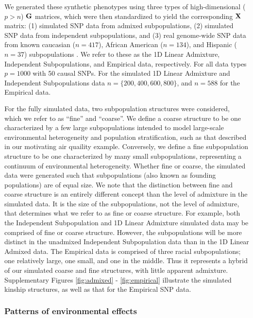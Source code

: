We generated these synthetic phenotypes using three types of high-dimensional ($p > n$) $\mathbf{G}$ matrices, which were then standardized to yield the corresponding $\mathbf{X}$ matrix: (1) simulated SNP data from admixed subpopulations, (2) simulated SNP data from independent subpopulations, and (3) real genome-wide SNP data from known caucasian ($n = 417$), African American ($n = 134$), and Hispanic ($n = 37$) subpopulations \citep{larkin2015objectives}. We refer to these as the 1D Linear Admixture, Independent Subpopulations, and Empirical data, respectively. For all data types $p = 1000$ with 50 causal SNPs. For the simulated 1D Linear Admixture and Independent Subpopulations data $n = \{200, 400, 600, 800 \}$, and $n = 588$ for the Empirical data. 

For the fully simulated data, two subpopulation structures were considered, which we refer to as ``fine'' and ``coarse''.  We define a coarse structure to be one characterized by a few large subpopulations intended to model large-scale environmental heterogeneity and population stratification, such as that described in our motivating air quaility example. Conversely, we define a fine subpopulation structure to be one characterized by many small subpopulations, representing a continuum of environmental heterogeneity. Whether fine or coarse, the simulated data were generated such that subpopulations (also known as founding populations) are of equal size. We note that the distinction between fine and coarse structure is an entirely different concept than the level of admixture in the simulated data. It is the size of the subpopulations, not the level of admixture, that determines what we refer to as fine or coarse structure. For example, both the Independent Subpopulation and 1D Linear Admixture simulated data may be comprised of fine or coarse structure. However, the subpopulations will be more distinct in the unadmixed Independent Subpopulation data than in the 1D Linear Admixed data. The Empirical data is comprised of three racial subpopulations; one relatively large, one small, and one in the middle. Thus it represents a hybrid of our simulated coarse and fine structures, with little apparent admixture. Supplementary Figures \ref{fig:admixed} - \ref{fig:empirical} illustrate the simulated kinship structures, as well as that for the Empirical SNP data. 

\subsubsection{Patterns of environmental effects}

